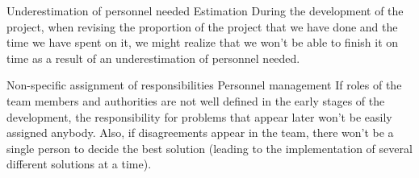 \begin{risk}{Underestimation of personnel needed}
\label{riskPersonnelUnderestimation}
\riskcat Estimation
\riskdesc During the development of the project, when revising the proportion of the project that we have done and the time we have spent on it, we might realize that we won't be able to finish it on time as a result of an underestimation of personnel needed.
\end{risk}

\begin{risk}{Non-specific assignment of responsibilities}
\label{riskResponsibilitesAssignment}
\riskcat Personnel management
\riskdesc If roles of the team members and authorities are not well defined in the early stages of the development, the responsibility for problems that appear later won't be easily assigned anybody. Also, if disagreements appear in the team, there won't be a single person to decide the best solution (leading to the implementation of several different solutions at a time).
\end{risk}
